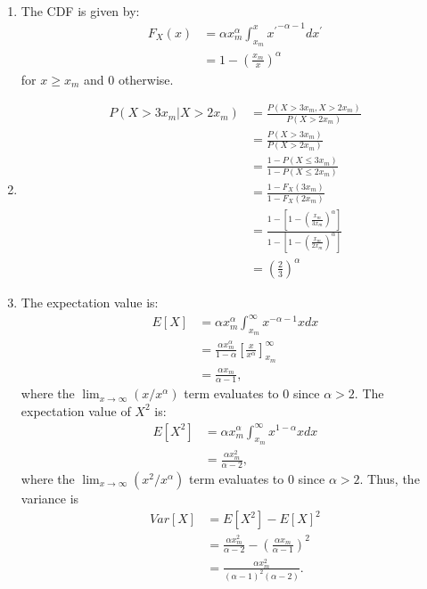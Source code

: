 \begin{problem}{21}$ $
\begin{enumerate}
\item The CDF is given by:
	\begin{align*}
	F_X(x) &= \alpha x_m^\alpha \int_{x_m}^x {x^\prime}^{-\alpha-1}dx^\prime \\
	& = 1- \left(\frac{x_m}{x} \right)^\alpha
	\end{align*}
for $x\ge x_m$ and $0$ otherwise.
	
\item
	\begin{align*}
P(X>3 x_m|X>2x_m)&=\frac{P(X>3 x_m, X>2x_m)}{P(X>2x_m)} \\
& = \frac{P(X>3 x_m)}{P(X>2x_m)} \\
& = \frac{1- P(X \le 3 x_m)}{1- P(X\le 2x_m)}\\
& = \frac{1- F_X(3x_m)}{1- F_X(2x_m)}\\
& = \frac{1- \left [1-\left(\frac{x_m}{3x_m} \right)^\alpha \right]}{1- \left [1-\left(\frac{x_m}{2x_m} \right)^\alpha \right]}\\
& = \left( \frac{2}{3} \right)^\alpha
	\end{align*}
	
\item The expectation value is:
	\begin{align*}
	E[X] &= \alpha x_m^\alpha \int_{x_m}^\infty x^{-\alpha -1}xdx \\
	&=\frac{\alpha x_m^\alpha}{1-\alpha }\left[ \frac{ x}{x^\alpha}\right]_{x_m}^\infty \\
	& = \frac{\alpha x_m}{\alpha -1},
	\end{align*}
where the $\lim_{x \rightarrow \infty} (x/x^\alpha)$ term evaluates to 0 since $\alpha>2$.  The expectation value of $X^2$ is:
	\begin{align*}
	E[X^2] &= \alpha x_m^\alpha \int_{x_m}^\infty x^{1-\alpha}xdx \\
	& = \frac{\alpha x_m^2}{\alpha -2},
	\end{align*}
where the $\lim_{x \rightarrow \infty} (x^2/x^\alpha)$ term evaluates to 0 since $\alpha>2$.  Thus, the variance is
	\begin{align*}
	Var[X] &= E[X^2]-E[X]^2 \\
	& =  \frac{\alpha x_m^2}{\alpha -2} - \left ( \frac{\alpha x_m}{\alpha -1} \right)^2 \\
	& = \frac{\alpha x_m^2}{(\alpha -1)^2(\alpha -2)}.
	\end{align*}

	\end{enumerate}
\end{problem}



